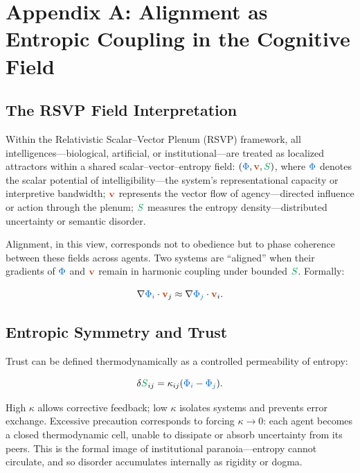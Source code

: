 \documentclass[11pt,a4paper]{article}
\newcommand{\scalar}[1]{\textcolor{scalarcolor}{\ensuremath{#1}}}
\newcommand{\vect}[1]{\textcolor{vectorcolor}{\ensuremath{\mathbf{#1}}}}
\newcommand{\entropy}[1]{\textcolor{entropycolor}{\ensuremath{#1}}}
\theoremstyle{definition}
\theoremstyle{plain}
\begin{document}
\section*{Appendix A: Alignment as Entropic Coupling in the Cognitive Field}

\begin{mdframed}[style=appendixbox]

\subsection{The RSVP Field Interpretation}
Within the Relativistic Scalar--Vector Plenum (RSVP) framework, all intelligences---biological, artificial, or institutional---are treated as localized attractors within a shared scalar--vector--entropy field: $(\scalar{\Phi}, \vect{v}, \entropy{S})$, where $\scalar{\Phi}$ denotes the scalar potential of intelligibility---the system's representational capacity or interpretive bandwidth; $\vect{v}$ represents the vector flow of agency---directed influence or action through the plenum; $\entropy{S}$ measures the entropy density---distributed uncertainty or semantic disorder.

Alignment, in this view, corresponds not to obedience but to phase coherence between these fields across agents. Two systems are ``aligned'' when their gradients of $\scalar{\Phi}$ and $\vect{v}$ remain in harmonic coupling under bounded $\entropy{S}$. Formally:

\begin{equation}
\nabla \scalar{\Phi_i} \cdot \vect{v}_j \approx \nabla \scalar{\Phi_j} \cdot \vect{v}_i.
\end{equation}

\subsection{Entropic Symmetry and Trust}
Trust can be defined thermodynamically as a controlled permeability of entropy:

\begin{equation}
\delta \entropy{S}_{ij} = \kappa_{ij}(\scalar{\Phi_i} - \scalar{\Phi_j}).
\end{equation}

High $\kappa$ allows corrective feedback; low $\kappa$ isolates systems and prevents error exchange. Excessive precaution corresponds to forcing $\kappa \to 0$: each agent becomes a closed thermodynamic cell, unable to dissipate or absorb uncertainty from its peers. This is the formal image of institutional paranoia---entropy cannot circulate, and so disorder accumulates internally as rigidity or dogma.


\end{mdframed}
\end{document}
